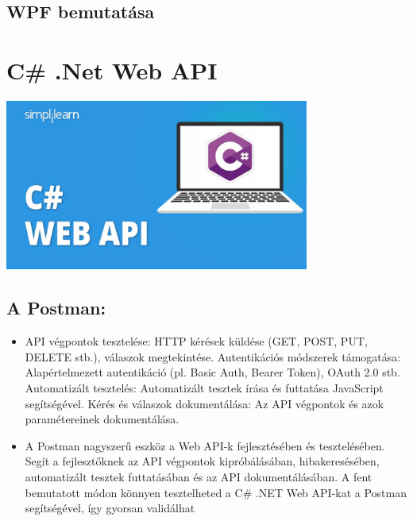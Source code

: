 \documentclass[colorlinks]{thesis-kando}
\theoremstyle{definition}
\theoremstyle{remark}
\begin{document}
\begin{itemize}
\begin{itemize}
\section{WPF bemutatása}
\end{itemize}



\end{itemize}
\newpage
\section{C\# .Net Web API}
\includegraphics[width=10cm]{figures/netapi.jpg}

\subsection{A Postman:}
\begin{itemize}
    \item API végpontok tesztelése: HTTP kérések küldése (GET, POST, PUT, DELETE stb.), válaszok megtekintése.
    Autentikációs módszerek támogatása: Alapértelmezett autentikáció (pl. Basic Auth, Bearer Token), OAuth 2.0 stb.
    Automatizált tesztelés: Automatizált tesztek írása és futtatása JavaScript segítségével.
    Kérés és válaszok dokumentálása: Az API végpontok és azok paramétereinek dokumentálása.
    
    \item A Postman nagyszerű eszköz a Web API-k fejlesztésében és tesztelésében. Segít a fejlesztőknek az API végpontok kipróbálásában, hibakeresésében, automatizált tesztek futtatásában és az API dokumentálásában. A fent bemutatott módon könnyen tesztelheted a C\# .NET Web API-kat a Postman segítségével, így gyorsan validálhat
    
\end{itemize}
\end{document}
